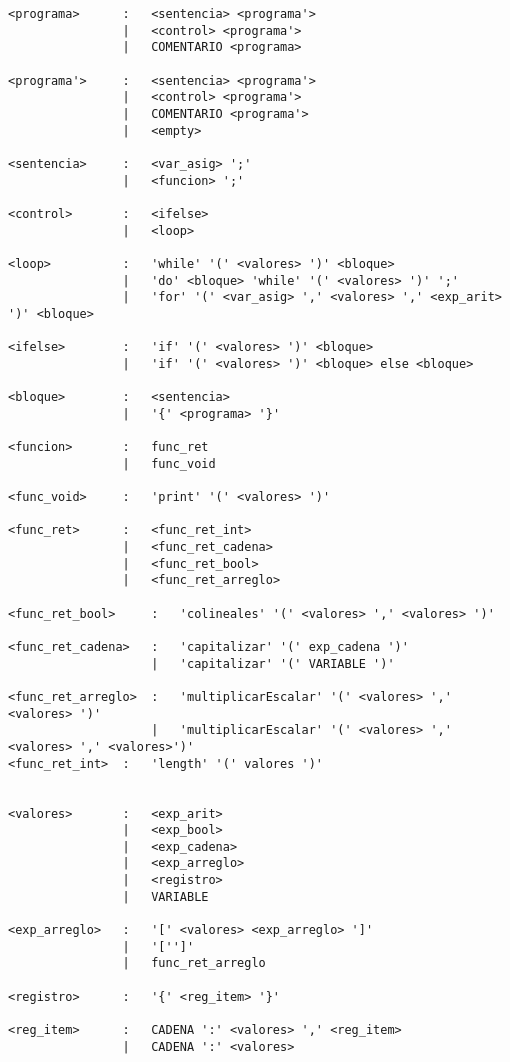 \begin{verbatim}
<programa>      :   <sentencia> <programa'>   
                |   <control> <programa'>   
                |   COMENTARIO <programa>   

<programa'>     :   <sentencia> <programa'>   
                |   <control> <programa'>   
                |   COMENTARIO <programa'>   
                |   <empty>

<sentencia>     :   <var_asig> ';'
                |   <funcion> ';'

<control>       :   <ifelse>
                |   <loop>

<loop>          :   'while' '(' <valores> ')' <bloque>
                |   'do' <bloque> 'while' '(' <valores> ')' ';' 
                |   'for' '(' <var_asig> ',' <valores> ',' <exp_arit> ')' <bloque>

<ifelse>        :   'if' '(' <valores> ')' <bloque>
                |   'if' '(' <valores> ')' <bloque> else <bloque>

<bloque>        :   <sentencia>
                |   '{' <programa> '}'

<funcion>       :   func_ret
                |   func_void

<func_void>     :   'print' '(' <valores> ')'

<func_ret>      :   <func_ret_int>
                |   <func_ret_cadena>
                |   <func_ret_bool>
                |   <func_ret_arreglo>

<func_ret_bool>     :   'colineales' '(' <valores> ',' <valores> ')'

<func_ret_cadena>   :   'capitalizar' '(' exp_cadena ')'
                    |   'capitalizar' '(' VARIABLE ')'

<func_ret_arreglo>  :   'multiplicarEscalar' '(' <valores> ',' <valores> ')'
                    |   'multiplicarEscalar' '(' <valores> ',' <valores> ',' <valores>')'
<func_ret_int>  :   'length' '(' valores ')'


<valores>       :   <exp_arit>
                |   <exp_bool>
                |   <exp_cadena>
                |   <exp_arreglo>
                |   <registro>
                |   VARIABLE

<exp_arreglo>   :   '[' <valores> <exp_arreglo> ']'
                |   '['']'
                |   func_ret_arreglo

<registro>      :   '{' <reg_item> '}'

<reg_item>      :   CADENA ':' <valores> ',' <reg_item>
                |   CADENA ':' <valores> 


\end{verbatim}
